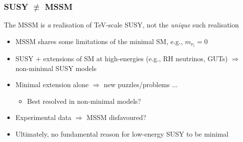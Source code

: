 \documentclass[10pt,aspectratio=169]{beamer}
\begin{document}
\begin{frame}
  \frametitle{SUSY $\not\equiv$ MSSM}
  \begin{center}
    The MSSM is \emph{a} realisation of TeV-scale SUSY,
      \alert{not the \emph{unique} such realisation}
  \end{center}
  \begin{itemize}\itemsep1em
  \item MSSM shares some limitations of the minimal SM, e.g., $m_{\nu_i} = 0$
  \item SUSY $+$ extensions of SM at high-energies (e.g., RH neutrinos, GUTs)
    $\Rightarrow$ non-minimal SUSY models
  \item Minimal extension alone $\Rightarrow$ new puzzles/problems $\ldots$
    \begin{itemize}
      \item Best resolved in non-minimal models?
    \end{itemize}
  \item Experimental data $\Rightarrow$ MSSM disfavoured?
  \item Ultimately, no fundamental reason for low-energy SUSY to be minimal
  \end{itemize}
\end{frame}
\end{document}
